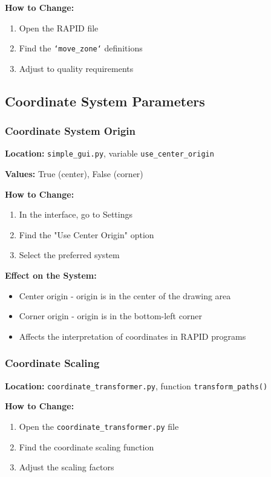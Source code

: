 \documentclass[a4paper,12pt]{article}
\begin{document}
\textbf{How to Change:}
\begin{enumerate}
\item Open the RAPID file
\item Find the \texttt{`move\_zone`} definitions
\item Adjust to quality requirements
\end{enumerate}

\subsection{Coordinate System Parameters}

\subsubsection{Coordinate System Origin}
\textbf{Location:} \texttt{simple\_gui.py}, variable \texttt{use\_center\_origin}

\textbf{Values:} True (center), False (corner)

\textbf{How to Change:}
\begin{enumerate}
\item In the interface, go to Settings
\item Find the "Use Center Origin" option
\item Select the preferred system
\end{enumerate}

\textbf{Effect on the System:}
\begin{itemize}
\item Center origin - origin is in the center of the drawing area
\item Corner origin - origin is in the bottom-left corner
\item Affects the interpretation of coordinates in RAPID programs
\end{itemize}

\subsubsection{Coordinate Scaling}
\textbf{Location:} \texttt{coordinate\_transformer.py}, function \texttt{transform\_paths()}

\textbf{How to Change:}
\begin{enumerate}
\item Open the \texttt{coordinate\_transformer.py} file
\item Find the coordinate scaling function
\item Adjust the scaling factors
\end{enumerate}
\end{document}
